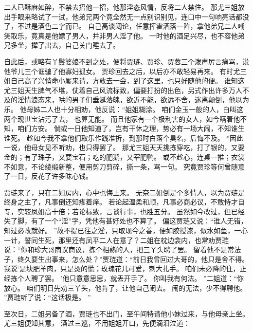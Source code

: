 二人已酥麻如醉，不禁去招他一招，他那淫态风情，反将二人禁住。
那尤三姐放出手眼来略试了一试，他弟兄两个竟全然无一点别识别见，连口中一句响亮话都没了，不过是酒色二字而已。
自己高谈阔论，任意挥霍洒落一阵，拿他弟兄二人嘲笑取乐，竟真是他嫖了男人，并非男人淫了他。
一时他的酒足兴尽，也不容他弟兄多坐，撵了出去，自己关门睡去了。
\par
自此后，或略有丫鬟婆娘不到之处，便将贾琏、贾珍、贾蓉三个泼声厉言痛骂，说他爷儿三个诓骗了他寡妇孤女。
贾珍回去之后，以后亦不敢轻易再来。
有时尤三姐自己高了兴悄命小厮来请，方敢去一会，到了这里，也只好随他的便。
谁知这尤三姐天生脾气不堪，仗着自己风流标致，偏要打扮的出色，另式作出许多万人不及的淫情浪态来，哄的男子们垂涎落魄，欲近不能，欲远不舍，迷离颠倒，他以为乐。
他母姊二人也十分相劝，他反说：“姐姐糊涂。
咱们金玉一般的人，白叫这两个现世宝沾污了去，
也算无能。
而且他家有一个极利害的女人，如今瞒着他不知，咱们方安。
倘或一日他知道了，岂有干休之理，势必有一场大闹，不知谁生谁死。
趁如今我不拿他们取乐作践准折，到那时白落个臭名，后悔不及。
”因此一说，他母女见不听劝，也只得罢了。
那尤三姐天天挑拣穿吃，打了银的，又要金的；有了珠子，又要宝石；吃的肥鹅，又宰肥鸭。
或不趁心，连桌一推；衣裳不如意，不论绫缎新整，便用剪刀剪碎，撕一条，骂一句。
究竟贾珍等何曾随意了一日，反花了许多昧心钱。
\par
贾琏来了，只在二姐房内，心中也悔上来。
无奈二姐倒是个多情人，以为贾琏是终身之主了，凡事倒还知疼着痒。
若论起温柔和顺，凡事必商必议，不敢恃才自专，实较凤姐高十倍；若论标致，言谈行事，也胜五分。
虽然如今改过，但已经失了脚，有了一个“淫”字，凭他有甚好处也不算了。
偏这贾琏又说：“谁人无错，知过必改就好。
”故不提已往之淫，只取现今之善，便如胶授漆，似水如鱼，一心一计，誓同生死，那里还有凤平二人在意了？二姐在枕边衾内，也常劝贾琏说：“你和珍大哥商议商议，拣个相熟的人，把三丫头聘了罢。
留着他不是常法子，终久要生出事来，怎么处？”贾琏道：“前日我曾回过大哥的，他只是舍不得。
我说‘是块肥羊肉，只是烫的慌；玫瑰花儿可爱，刺大扎手。
咱们未必降的住，正经拣个人聘了罢。
’他只意意思思，就丢开手了。
你叫我有何法。
”二姐道：“你放心。
咱们明日先劝三丫头，他肯了，让他自己闹去。
闹的无法，少不得聘他。
”贾琏听了说：“这话极是。
”\par
至次日，二姐另备了酒，贾琏也不出门，至午间特请他小妹过来，与他母亲上坐。
尤三姐便知其意，
酒过三巡，不用姐姐开口，先便滴泪泣道：
